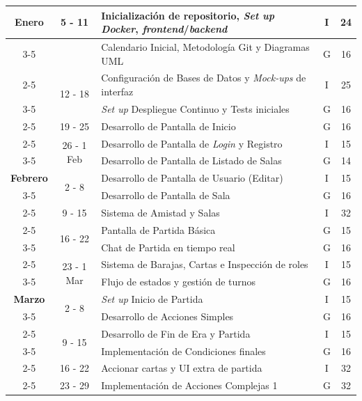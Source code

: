 \begin{longtable}{|c|c|p{7cm}|c|c|}
        \textbf{Enero} 
        & \multirow{2}{*}{5 - 11} & Inicialización de repositorio, \textit{Set up} \textit{Docker}, \textit{frontend}/\textit{backend} & I & 24 \\ \cline{3-5}
        & & Calendario Inicial, Metodología Git y Diagramas UML & G & 16 \\ \cline{2-5}
        & \multirow{2}{*}{12 - 18} & Configuración de Bases de Datos y \textit{Mock-ups} de interfaz & I & 25 \\ \cline{3-5}
        & & \textit{Set up} Despliegue Continuo y Tests iniciales & G & 16 \\ \cline{2-5}
        & 19 - 25 & Desarrollo de Pantalla de Inicio & G & 16 \\ \cline{2-5}
        & \multirow{2}{*}{26 - 1 Feb} & Desarrollo de Pantalla de \textit{Login} y Registro & I & 15 \\ \cline{3-5}
        & & Desarrollo de Pantalla de Listado de Salas & G & 14 \\
        \hline
        \textbf{Febrero} 
        & \multirow{2}{*}{2 - 8} & Desarrollo de Pantalla de Usuario (Editar) & I & 15 \\ \cline{3-5}
        & & Desarrollo de Pantalla de Sala & G & 16 \\ \cline{2-5}
        & 9 - 15 & Sistema de Amistad y Salas & I & 32 \\ \cline{2-5}
        & \multirow{2}{*}{16 - 22} & Pantalla de Partida Básica & G & 15 \\ \cline{3-5}
        & & Chat de Partida en tiempo real & G & 16 \\ \cline{2-5}
        & \multirow{2}{*}{23 - 1 Mar} & Sistema de Barajas, Cartas e Inspección de roles & I & 15 \\ \cline{3-5}
        & & Flujo de estados y gestión de turnos & G & 16 \\
        \hline
        \textbf{Marzo} 
        & \multirow{2}{*}{2 - 8} & \textit{Set up} Inicio de Partida & I & 15 \\ \cline{3-5}
        & & Desarrollo de Acciones Simples & G & 16 \\ \cline{2-5}
        & \multirow{2}{*}{9 - 15} & Desarrollo de Fin de Era y Partida & I & 15 \\ \cline{3-5}
        & & Implementación de Condiciones finales & G & 16 \\ \cline{2-5}
        & 16 - 22 & Accionar cartas y UI extra de partida & I & 32 \\ \cline{2-5}
        & 23 - 29 & Implementación de Acciones Complejas 1 & G & 32 \\

\end{longtable}
